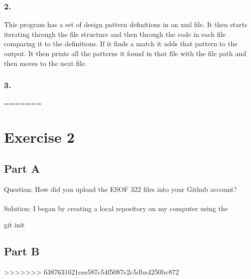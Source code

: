 \documentclass{article}
\begin{document}
\subsubsection*{2.}
This program has a set of design pattern definitions in an xml file. It then starts iterating through the file structure and then through the code in each file comparing it to the definitions. If it finds a match it adds that pattern to the output. It then prints all the patterns it found in that file with the file path and then moves to the next file. 
\subsubsection*{3.}
=======

\newpage

\section*{Exercise 2}

\subsection*{Part A}

Question: How did you upload the ESOF 322 files into your Github account? \\\\
Solution: I began by creating a local repository on my computer using the
\begin{spverbatim}
	git init
\end{spverbatim}

\subsection*{Part B}
>>>>>>> 6387631621cee587c54f5087e2c5dba4250bc872
\end{document}
